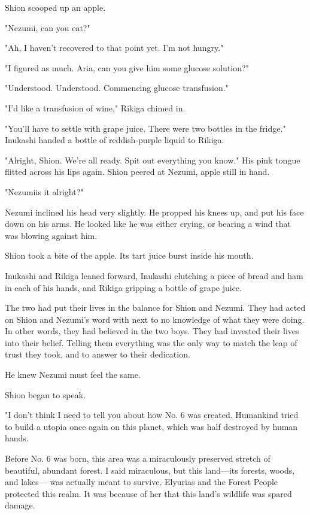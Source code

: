 Shion scooped up an apple.

"Nezumi, can you eat?"

"Ah, I haven't recovered to that point yet. I'm not hungry."

"I figured as much. Aria, can you give him some glucose solution?"

{\sffamily "Understood. Understood. Commencing glucose transfusion."}

"I'd like a transfusion of wine," Rikiga chimed in.

"You'll have to settle with grape juice. There were two bottles in the
fridge." Inukashi handed a bottle of reddish-purple liquid to Rikiga.

"Alright, Shion. We're all ready. Spit out everything you know." His
pink tongue flitted across his lips again. Shion peered at Nezumi, apple
still in hand.

"Nezumi\el is it alright?"

Nezumi inclined his head very slightly. He propped his knees up, and put
his face down on his arms. He looked like he was either crying, or
bearing a wind that was blowing against him.

Shion took a bite of the apple. Its tart juice burst inside his mouth.

Inukashi and Rikiga leaned forward, Inukashi clutching a piece of bread
and ham in each of his hands, and Rikiga gripping a bottle of grape
juice.

The two had put their lives in the balance for Shion and Nezumi. They
had acted on Shion and Nezumi's word with next to no knowledge of what
they were doing. In other words, they had believed in the two boys. They
had invested their lives into their belief. Telling them everything was
the only way to match the leap of trust they took, and to answer to
their dedication.

He knew Nezumi must feel the same.

Shion began to speak.

\mybreak

"I don't think I need to tell you about how No. 6 was created. Humankind
tried to build a utopia once again on this planet, which was half
destroyed by human hands.

Before No. 6 was born, this area was a miraculously preserved stretch of
beautiful, abundant forest. I said miraculous, but this land---its
forests, woods, and lakes--- was actually meant to survive. Elyurias and
the Forest People protected this realm. It was because of her that this
land's wildlife was spared damage.

